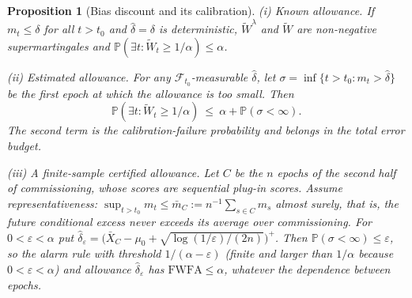 \documentclass[12pt,a4paper]{article}
\newenvironment{revblock}{}{}
\newenvironment{revblock}{\begingroup\color{revcol}}{\endgroup}
\newcommand{\rtwo}[1]{#1}
\newcommand{\rtwo}[1]{{\color{revcolb}#1}}
\newtheorem{proposition}{Proposition}
\newcommand{\Prob}{\mathbb{P}}
\newcommand{\F}{\mathcal{F}}
\begin{document}
\begin{proposition}[Bias discount and its calibration]\label{prop:delta}
\begin{revblock}
\noindent(i) \emph{Known allowance.} If $m_t\le\delta$ for all $t>t_0$ and $\hat\delta=\delta$ is deterministic, $\widetilde W^\lambda$ and $\widetilde W$ are non-negative supermartingales and $\Prob(\exists t:\widetilde W_t\ge1/\alpha)\le\alpha$.

\noindent(ii) \emph{Estimated allowance.} For any $\F_{t_0}$-measurable $\hat\delta$, let $\sigma=\inf\{t>t_0:m_t>\hat\delta\}$ be the first epoch at which the allowance is too small. Then
\[
\Prob(\exists t:\widetilde W_t\ge1/\alpha)\ \le\ \alpha+\Prob(\sigma<\infty).
\]
The second term is the calibration-failure probability and belongs in the total error budget.

\noindent(iii) \emph{A finite-sample certified allowance.} Let $C$ be the $n$ epochs of the second half of commissioning, whose scores are sequential plug-in scores. Assume \emph{representativeness}: $\sup_{t>t_0}m_t\le\bar m_C:=n^{-1}\sum_{s\in C}m_s$ almost surely, that is, the future conditional excess never exceeds its average over commissioning. \rtwo{For \rtwo{$0<\varepsilon<\alpha$} put $\hat\delta_\varepsilon=\big(\bar X_C-\mu_0+\sqrt{\log(1/\varepsilon)/(2n)}\big)^{+}$.} \rtwo{Then $\Prob(\sigma<\infty)\le\varepsilon$, so the alarm rule with threshold $1/(\alpha-\varepsilon)$ \rtwo{(finite and larger than $1/\alpha$ because $0<\varepsilon<\alpha$)} and allowance $\hat\delta_\varepsilon$ has $\mathrm{FWFA}\le\alpha$, whatever the dependence between epochs.}
\end{revblock}
\end{proposition}
\end{document}
